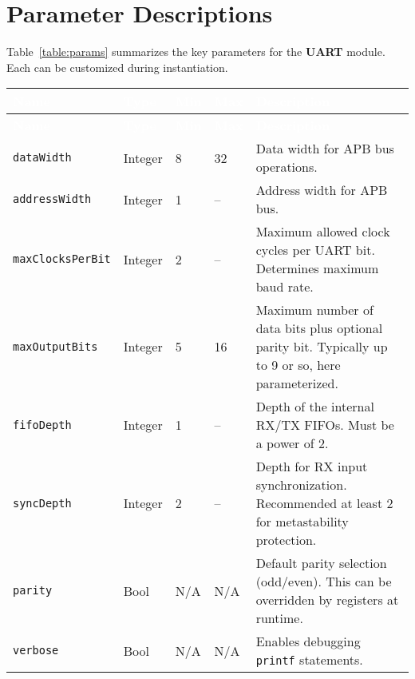 \section{Parameter Descriptions}

Table~\ref{table:params} summarizes the key parameters for the \textbf{UART} module. Each can be customized during instantiation.

\renewcommand*{\arraystretch}{1.3}
\begingroup
\small
{}

\begin{longtable}[H]{
  | p{}
  | p{}
  | p{}
  | p{}
  | p{} |
}
\hline
\rowcolor{gray}
\textcolor{white}{\textbf{Name}} &
\textcolor{white}{\textbf{Type}} &
\textcolor{white}{\textbf{Min}} &
\textcolor{white}{\textbf{Max}} &
\textcolor{white}{\textbf{Description}} \\ 
\hline
\endfirsthead

\hline
\rowcolor{gray}
\textcolor{white}{\textbf{Name}} &
\textcolor{white}{\textbf{Type}} &
\textcolor{white}{\textbf{Min}} &
\textcolor{white}{\textbf{Max}} &
\textcolor{white}{\textbf{Description}} \\ 
\hline
\endhead

\hline
\endfoot

\texttt{dataWidth} &
Integer &
8 &
32 &
Data width for APB bus operations. \\ \hline

\texttt{addressWidth} &
Integer &
1 &
-- &
Address width for APB bus. \\ \hline

\texttt{maxClocksPerBit} &
Integer &
2 &
-- &
Maximum allowed clock cycles per UART bit. Determines maximum baud rate. \\ \hline

\texttt{maxOutputBits} &
Integer &
5 &
16 &
Maximum number of data bits plus optional parity bit. Typically up to 9 or so, here parameterized. \\ \hline

\texttt{fifoDepth} &
Integer &
1 &
-- &
Depth of the internal RX/TX FIFOs. Must be a power of 2. \\ \hline

\texttt{syncDepth} &
Integer &
2 &
-- &
Depth for RX input synchronization. Recommended at least 2 for metastability protection. \\ \hline

\texttt{parity} &
Bool &
N/A &
N/A &
Default parity selection (odd/even). This can be overridden by registers at runtime. \\ \hline

\texttt{verbose} &
Bool &
N/A &
N/A &
Enables debugging \texttt{printf} statements. \\ \hline

\end{longtable}
\label{table:params}
\endgroup


